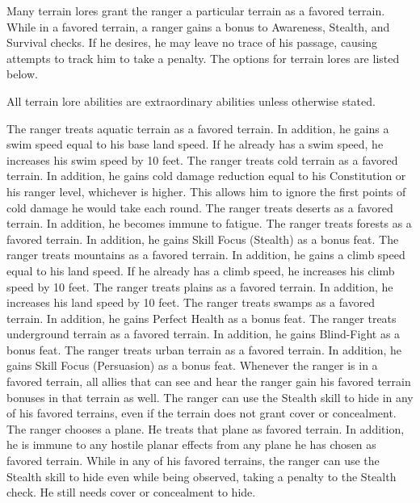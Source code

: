 Many terrain lores grant the ranger a particular terrain as a favored terrain.
While in a favored terrain, a ranger gains a  bonus to Awareness, Stealth, and Survival checks.
If he desires, he may leave no trace of his passage, causing attempts to track him to take a  penalty.
The options for terrain lores are listed below.

All terrain lore abilities are extraordinary abilities unless otherwise stated.

    The ranger treats aquatic terrain as a favored terrain.
    In addition, he gains a swim speed equal to his base land speed.
    If he already has a swim speed, he increases his swim speed by 10 feet.
    The ranger treats cold terrain as a favored terrain.
    In addition, he gains cold damage reduction equal to his Constitution or his ranger level, whichever is higher.
    This allows him to ignore the first points of cold damage he would take each round.
    The ranger treats deserts as a favored terrain.
    In addition, he becomes immune to fatigue.
    The ranger treats forests as a favored terrain.
    In addition, he gains Skill Focus (Stealth) as a bonus feat.
    The ranger treats mountains as a favored terrain.
    In addition, he gains a climb speed equal to his land speed.
    If he already has a climb speed, he increases his climb speed by 10 feet.
    The ranger treats plains as a favored terrain.
    In addition, he increases his land speed by 10 feet.
    The ranger treats swamps as a favored terrain.
    In addition, he gains Perfect Health as a bonus feat.
    The ranger treats underground terrain as a favored terrain.
    In addition, he gains Blind-Fight as a bonus feat.
    The ranger treats urban terrain as a favored terrain.
    In addition, he gains Skill Focus (Persuasion) as a bonus feat.
    Whenever the ranger is in a favored terrain, all allies that can see and hear the ranger gain his favored terrain bonuses in that terrain as well.
    The ranger can use the Stealth skill to hide in any of his favored terrains, even if the terrain does not grant cover or concealment.
    The ranger chooses a plane.
    He treats that plane as favored terrain.
    In addition, he is immune to any hostile planar effects from any plane he has chosen as favored terrain.
    While in any of his favored terrains, the ranger can use the Stealth skill to hide even while being observed, taking a  penalty to the Stealth check.
    He still needs cover or concealment to hide.


